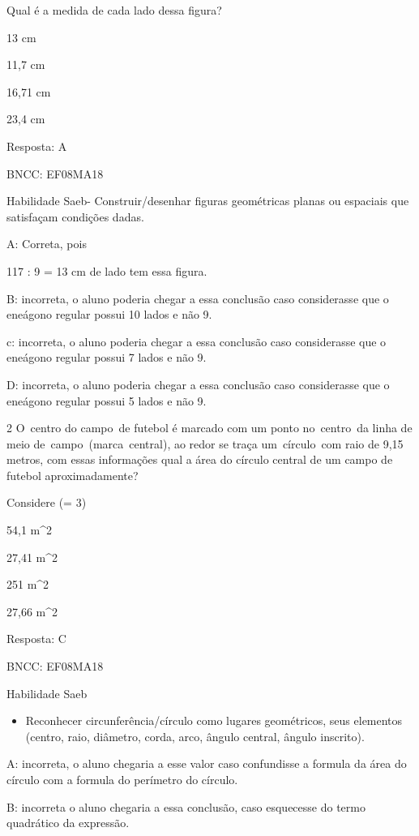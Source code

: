 Qual é a medida de cada lado dessa figura?

\item 13 cm
\item 11,7 cm
\item 16,71 cm
\item 23,4 cm

Resposta: A

BNCC: EF08MA18

Habilidade Saeb- Construir/desenhar figuras geométricas planas ou
espaciais que satisfaçam condições dadas.

A: Correta, pois

117 : 9 = 13 cm de lado tem essa figura.

B: incorreta, o aluno poderia chegar a essa conclusão caso considerasse
que o eneágono regular possui 10 lados e não 9.

c: incorreta, o aluno poderia chegar a essa conclusão caso considerasse
que o eneágono regular possui 7 lados e não 9.

D: incorreta, o aluno poderia chegar a essa conclusão caso considerasse
que o eneágono regular possui 5 lados e não 9.

\num{2} O~centro do campo~de futebol é marcado com um ponto no~centro~da
linha de meio de~campo~(marca~central), ao redor se traça um~círculo~com
raio de 9,15 metros, com essas informações qual a área do círculo
central de um campo de futebol aproximadamente?

Considere (\pi = 3)

\item 54,1 m^2
\item 27,41 m^2
\item 251 m^2
\item 27,66 m^2

Resposta: C

BNCC: EF08MA18

Habilidade Saeb

\begin{itemize}
\tightlist

\item 
  Reconhecer circunferência/círculo como lugares geométricos, seus
  elementos (centro, raio, diâmetro, corda, arco, ângulo central, ângulo
  inscrito).
\end{itemize}

A: incorreta, o aluno chegaria a esse valor caso confundisse a formula
da área do círculo com a formula do perímetro do círculo.

B: incorreta o aluno chegaria a essa conclusão, caso esquecesse do termo
quadrático da expressão.

